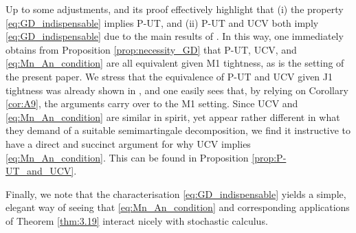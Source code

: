 \documentclass[11pt]{article}
\theoremstyle{definition}\newtheorem{example}[theorem]{Example}
\theoremstyle{definition}\newtheorem{counterexample}[theorem]{Counterexample}
\theoremstyle{definition}\newtheorem{remark}[theorem]{Remark}
\theoremstyle{definition}\newtheorem{defi}[theorem]{Definition}
\numberwithin{equation}{section}
\renewcommand{\|}{\; : \, \;}											%
\begin{document}
Up to some adjustments, \cite[Thm.~4]{KP_Durham} and its proof effectively highlight that (i) the property \eqref{eq:GD_indispensable} implies P-UT, and (ii) P-UT and UCV both imply \eqref{eq:GD_indispensable} due to the main results of \cite{jakubowskimeminpages,kurtzprotter}. In this way, one immediately obtains from Proposition \ref{prop:necessity_GD} that P-UT, UCV, and \eqref{eq:Mn_An_condition} are all equivalent given M1 tightness, as is the setting of the present paper. We stress that the equivalence of P-UT and UCV given J1 tightness was already shown in \cite{kurtzprotter}, and one easily sees that, by relying on Corollary \ref{cor:A9}, the arguments carry over to the M1 setting. Since UCV and \eqref{eq:Mn_An_condition} are similar in spirit, yet appear rather different in what they demand of a suitable semimartingale decomposition, we find it instructive to have a direct and succinct argument for why UCV implies \eqref{eq:Mn_An_condition}. This can be found in Proposition \ref{prop:P-UT_and_UCV}.

Finally, we note that the characterisation \eqref{eq:GD_indispensable} yields a simple, elegant way of seeing that \eqref{eq:Mn_An_condition}  and corresponding applications of Theorem \ref{thm:3.19} interact nicely with stochastic calculus.
\end{document}
